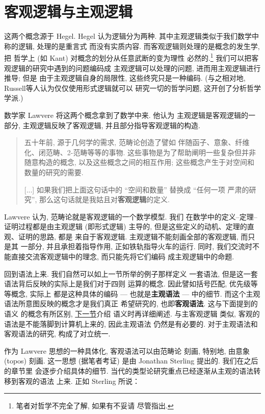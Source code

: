 \documentclass[UTF8]{ctexbook}
\theoremstyle{plain}
\theoremstyle{definition}
\theoremstyle{remark}
\begin{document}
\section{客观逻辑与主观逻辑}
这两个概念源于 Hegel. Hegel 认为逻辑分为两种.
其中主观逻辑类似于我们数学中称的逻辑, 处理的是重言式
而没有实质内容. 而客观逻辑则处理的是概念的发生学, 把
哲学上 (如 Kant) 对概念的划分从任意武断的变为理性
必然的.\footnote{笔者对哲学不完全了解, 如果有不妥请
尽管指出.} 我们可以把客观逻辑的研究中遇到的问题编码成
主观逻辑可以处理的问题, 进而用主观逻辑进行推导; 但是
由于主观逻辑自身的局限性, 这些终究只是一种编码.
(与之相对地, Russell等人认为仅仅使用形式逻辑就可以
研究一切的哲学问题, 这开创了分析哲学学派.)

数学家 Lawvere 将这两个概念拿到了数学中来. 他认为
主观逻辑是客观逻辑的一部分, 主观逻辑反映了客观逻辑,
并且部分指导客观逻辑的构造.
\begin{quotation}
五十年前, 源于几何学的需求, 范畴论创造了譬如
伴随函子、意象、纤维化、闭范畴、2-范畴等等的事物.
这些事物是为了帮助阐明一些复杂但并非随意构造的概念,
以及这些概念之间的相互作用; 这些概念产生于对空间和
数量的研究的需要.

[...] 如果我们把上面这句话中的 “空间和数量” 替换成 “任何一项
严肃的研究”, 那么这句话就是我姑且对\textbf{客观逻辑}的定义.%
\cite{lawvere:1994:objective}
\end{quotation}
Lawvere 认为, 范畴论就是客观逻辑的一个数学模型. 我们
在数学中的定义--定理--证明过程都是由主观逻辑 (即形式逻辑)
主导的, 但是这些定义的动机、定理的直观、证明的思路, 都是
来自于客观逻辑. 主观逻辑不能刻画全部的客观逻辑, 而只是其
一部分, 并且承担着指导作用, 正如铁轨指导火车的运行. 同时,
我们交流时不能直接交流客观逻辑中的理念, 而只能先将它们编码
成主观逻辑中的命题.

回到语法上来. 我们自然可以如上一节所举的例子那样定义
一套语法, 但是这一套语法背后反映的实际上是我们对于四则
运算的概念. 因此譬如括号匹配, 优先级等等概念, 实际上
都是这种具体的编码 --- 也就是\textbf{主观语法} ---
中的细节. 而这个主观语法所意图反映的概念才是我们真正
希望研究的, 也即\textbf{客观语法}. 这与下面提到的语义
的概念有所区别, \hyperref[intro:semantics]{下一节}介绍
语义时再详细阐述. 与主客观逻辑
类似, 客观的语法是不能落脚到计算机上来的, 因此主观语法
仍然是有必要的. 对于主观语法和客观语法的研究, 构成了对立统一.

作为 Lawvere 思想的一种具体化, 客观语法可以由范畴论
刻画, 特别地, 由意象 (topos) 刻画. 这一思想 (据笔者考证)
是由 Jonathan Sterling 提出的. 我们在之后的章节里
会逐步介绍具体的细节.
当代的类型论研究重点已经逐渐从主观的语法转移到客观的语法
上来. 正如 Sterling 所说：
\end{document}
